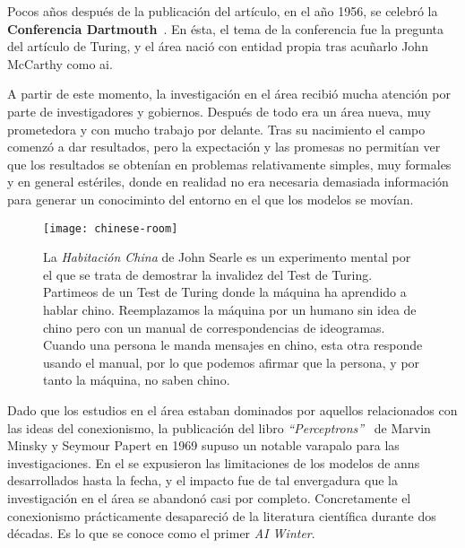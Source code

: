 Pocos años después de la publicación del artículo, en el año 1956, se celebró la \textbf{Conferencia Dartmouth}~\cite{mccarthy1956dartmouth}. En ésta, el tema de la conferencia fue la pregunta del artículo de Turing, y el área nació con entidad propia tras acuñarlo John McCarthy como \acrlong{ai}.

A partir de este momento, la investigación en el área recibió mucha atención por parte de investigadores y gobiernos. Después de todo era un área nueva, muy prometedora y con mucho trabajo por delante. Tras su nacimiento el campo comenzó a dar resultados, pero la expectación y las promesas no permitían ver que los resultados se obtenían en problemas relativamente simples, muy formales y en general estériles, donde en realidad no era necesaria demasiada información para generar un conociminto del entorno en el que los modelos se movían.

\begin{figure}[t]
	\centering
	\texttt{[image: chinese-room]}
	\label{fig:chinese-room}
	\caption[Experimento mental de la \textit{Habitación China}, por John Searle.]{La \textit{Habitación China} de John Searle es un experimento mental por el que se trata de demostrar la invalidez del Test de Turing. Partimeos de un Test de Turing donde la máquina ha aprendido a hablar chino. Reemplazamos la máquina por un humano sin idea de chino pero con un manual de correspondencias de ideogramas. Cuando una persona le manda mensajes en chino, esta otra responde usando el manual, por lo que podemos afirmar que la persona, y por tanto la máquina, no saben chino.}
\end{figure}

Dado que los estudios en el área estaban dominados por aquellos relacionados con las ideas del conexionismo, la publicación del libro \textit{\enquote{Perceptrons}}~\cite{minsky1969perceptrons} de Marvin Minsky y Seymour Papert en 1969 supuso un notable varapalo para las investigaciones. En el se expusieron las limitaciones de los modelos de \acp{ann} desarrollados hasta la fecha, y el impacto fue de tal envergadura que la investigación en el área se abandonó casi por completo. Concretamente el conexionismo prácticamente desapareció de la literatura científica durante dos décadas. Es lo que se conoce como el primer \textit{AI Winter}.

